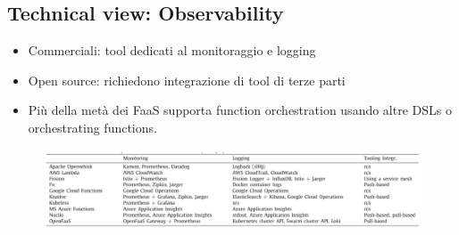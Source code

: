 \documentclass[a4paper, 12pt]{report}
\begin{document}
            \subsection{Technical view: Observability}
            \begin{itemize}
              \item Commerciali: tool dedicati al monitoraggio e logging
              \item Open source: richiedono integrazione di tool di terze parti
            \end{itemize}
            \begin{itemize}
              \item Più della metà dei FaaS supporta function orchestration usando altre DSLs o orchestrating functions.
            \end{itemize}
            \begin{figure}[h]
              \centering
              \includegraphics[scale=0.3]{Immagini/Observability.png}
            \end{figure}
\end{document}
